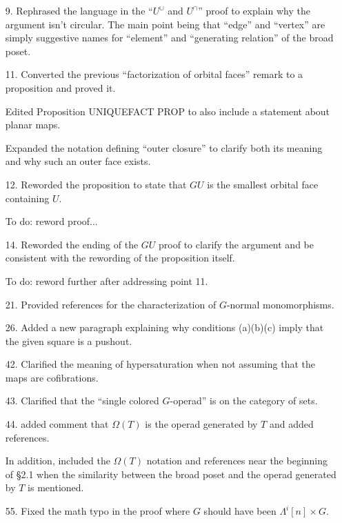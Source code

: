 \documentclass{article}
\begin{document}
\begin{itemize}
\item[9.] Rephrased the language in the ``$U^{\cup}$ and $U^{\cap}$'' proof to explain why the argument isn't circular. The main point being that ``edge'' and ``vertex'' are simply suggestive names for ``element'' and ``generating relation'' of the broad poset.


\item[11.] Converted the previous ``factorization of orbital faces'' remark to a proposition and proved it.

Edited Proposition UNIQUEFACT PROP to also include a statement about planar maps.

Expanded the notation defining ``outer closure'' to clarify both its meaning and why such an outer face exists.



\item[12.] Reworded the proposition to state that $GU$ is the smallest orbital face containing $U$.

{\color{red} To do:} reword proof...


\item[14.] Reworded the ending of the $GU$ proof to clarify the argument and be consistent with the rewording of the proposition itself.

{\color{red} To do:} reword further after addressing point 11.

\item[21.] Provided references for the characterization of $G$-normal monomorphisms.
 

\item[26.] Added a new paragraph explaining why conditions (a)(b)(c) imply that the given square is a pushout.

\item[42.] Clarified the meaning of hypersaturation when not assuming that the maps are cofibrations.

\item[43.] Clarified that the ``single colored $G$-operad'' is on the category of sets.

\item[44.] added comment that $\Omega(T)$ is the operad generated by $T$ and added references.

In addition, included the $\Omega(T)$ notation and references near the beginning of \S 2.1 when the similarity between the broad poset and the operad generated by $T$ is mentioned.

\item[55.] Fixed the math typo in the proof where $G$ should have been $\Lambda^i[n] \times G$.


\end{itemize}
\end{document}
